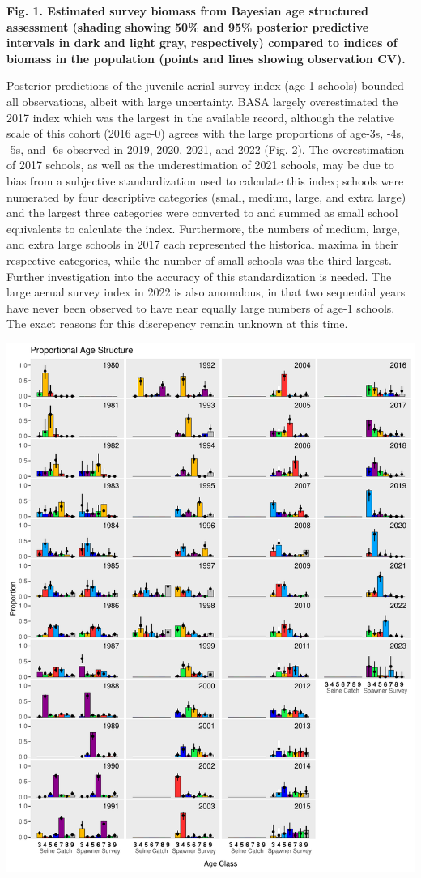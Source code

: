 \documentclass[
  11pt,
]{article}
\begin{document}
\textbf{Fig. 1. Estimated survey biomass from Bayesian age structured
assessment (shading showing 50\% and 95\% posterior predictive intervals
in dark and light gray, respectively) compared to indices of biomass in
the population (points and lines showing observation CV).}

Posterior predictions of the juvenile aerial survey index (age-1
schools) bounded all observations, albeit with large uncertainty. BASA
largely overestimated the 2017 index which was the largest in the
available record, although the relative scale of this cohort (2016
age-0) agrees with the large proportions of age-3s, -4s, -5s, and -6s
observed in 2019, 2020, 2021, and 2022 (Fig. 2). The overestimation of
2017 schools, as well as the underestimation of 2021 schools, may be due
to bias from a subjective standardization used to calculate this index;
schools were numerated by four descriptive categories (small, medium,
large, and extra large) and the largest three categories were converted
to and summed as small school equivalents to calculate the index.
Furthermore, the numbers of medium, large, and extra large schools in
2017 each represented the historical maxima in their respective
categories, while the number of small schools was the third largest.
Further investigation into the accuracy of this standardization is
needed. The large aerual survey index in 2022 is also anomalous, in that
two sequential years have never been observed to have near equally large
numbers of age-1 schools. The exact reasons for this discrepency remain
unknown at this time.

\begin{center}\includegraphics[width=0.85\linewidth]{figures/age_compositions} \end{center}
\end{document}
